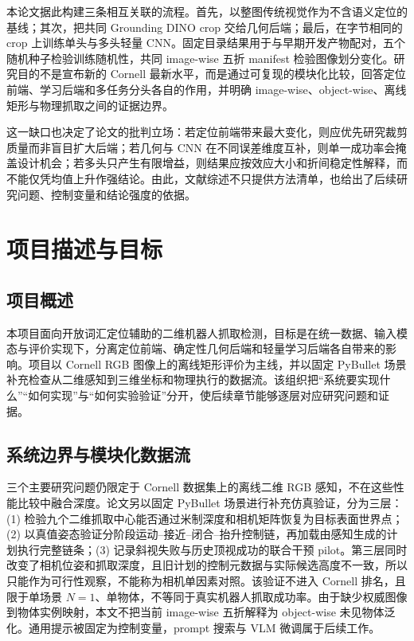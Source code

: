 \documentclass{l4proj}
\begin{document}
本论文据此构建三条相互关联的流程。首先，以整图传统视觉作为不含语义定位的基线；其次，把共同 Grounding DINO crop 交给几何后端；最后，在字节相同的 crop 上训练单头与多头轻量 CNN。固定目录结果用于与早期开发产物配对，五个随机种子检验训练随机性，共同 image-wise 五折 manifest 检验图像划分变化。研究目的不是宣布新的 Cornell 最新水平，而是通过可复现的模块化比较，回答定位前端、学习后端和多任务分头各自的作用，并明确 image-wise、object-wise、离线矩形与物理抓取之间的证据边界。

这一缺口也决定了论文的批判立场：若定位前端带来最大变化，则应优先研究裁剪质量而非盲目扩大后端；若几何与 CNN 在不同误差维度互补，则单一成功率会掩盖设计机会；若多头只产生有限增益，则结果应按效应大小和折间稳定性解释，而不能仅凭均值上升作强结论。由此，文献综述不只提供方法清单，也给出了后续研究问题、控制变量和结论强度的依据。

\chapter{项目描述与目标}

\section{项目概述}
本项目面向开放词汇定位辅助的二维机器人抓取检测，目标是在统一数据、输入模态与评价实现下，分离定位前端、确定性几何后端和轻量学习后端各自带来的影响。项目以 Cornell RGB 图像上的离线矩形评价为主线，并以固定 PyBullet 场景补充检查从二维感知到三维坐标和物理执行的数据流。该组织把“系统要实现什么”“如何实现”与“如何实验验证”分开，使后续章节能够逐层对应研究问题和证据。

\section{系统边界与模块化数据流}
三个主要研究问题仍限定于 Cornell 数据集上的离线二维 RGB 感知，不在这些性能比较中融合深度。论文另以固定 PyBullet 场景进行补充仿真验证，分为三层：(1) 检验九个二维抓取中心能否通过米制深度和相机矩阵恢复为目标表面世界点；(2) 以真值姿态验证分阶段运动--接近--闭合--抬升控制链，再加载由感知生成的计划执行完整链条；(3) 记录斜视失败与历史顶视成功的联合干预 pilot。第三层同时改变了相机位姿和抓取深度，且旧计划的控制元数据与实际候选高度不一致，所以只能作为可行性观察，不能称为相机单因素对照。该验证不进入 Cornell 排名，且限于单场景 $N=1$、单物体，不等同于真实机器人抓取成功率。由于缺少权威图像到物体实例映射，本文不把当前 image-wise 五折解释为 object-wise 未见物体泛化。通用提示被固定为控制变量，prompt 搜索与 VLM 微调属于后续工作。
\end{document}
